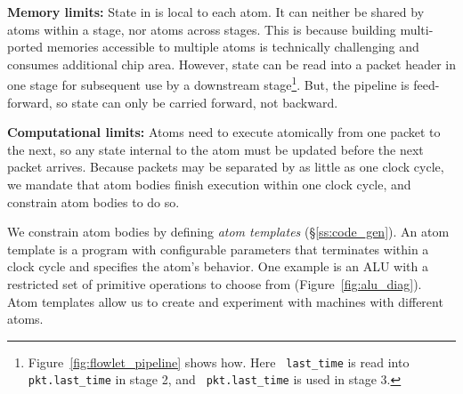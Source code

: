 \textbf{Memory limits: } State in \absmachine is local to each atom.  It can
neither be shared by atoms within a stage, nor atoms across stages. This is
because building multi-ported memories accessible to multiple atoms is
technically challenging and consumes additional chip area. However, state can
be read into a packet header in one stage for subsequent use by a downstream
stage\footnote{Figure~\ref{fig:flowlet_pipeline} shows how. Here {\tt
last\_time} is read into {\tt pkt.last\_time} in stage 2, and {\tt
pkt.last\_time} is used in stage 3.}.  But, the \absmachine pipeline is
feed-forward, so state can only be carried forward, not backward.

\textbf{Computational limits:} Atoms need to execute atomically from one packet
to the next, so any state internal to the atom must be updated
before the next packet arrives.  Because packets may be separated by as little
as one clock cycle, we mandate that atom bodies finish execution within one
clock cycle, and constrain atom bodies to do so.

We constrain atom bodies by defining {\it atom templates}
(\S\ref{ss:code_gen}).  An atom template is a program with configurable
parameters that terminates within a clock cycle and specifies the atom's
behavior.  One example is an ALU with a restricted set of primitive operations
to choose from (Figure~\ref{fig:alu_diag}). Atom templates allow us to create
and experiment with \absmachine machines with different atoms.



